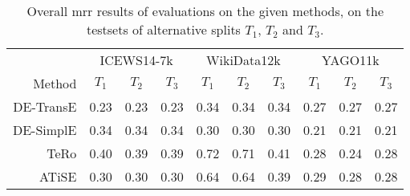 \begin{table}[htb]
\centering
\begin{minipage}{\columnwidthcaption}
\centering
\caption{Overall \gls{mrr} results of evaluations on the given methods, on the testsets of alternative splits $T_1$, $T_2$ and $T_3$.}
\label{tab:split_results}
\end{minipage}
\vspace{-3mm}

\begin{tabular}{r|ccc|ccc|ccc}
\hline
 & \multicolumn{3}{c|}{ICEWS14-7k} & \multicolumn{3}{c|}{WikiData12k} & \multicolumn{3}{c}{YAGO11k}\\
Method & $T_1$ & $T_2$ & $T_3$ & $T_1$ & $T_2$ & $T_3$ & $T_1$ & $T_2$ & $T_3$ \\
\hline
DE-TransE  & 0.23 & 0.23 & 0.23 & 0.34 & 0.34 & 0.34 & 0.27 & 0.27 & 0.27 \\
DE-SimplE  & 0.34 & 0.34 & 0.34 & 0.30 & 0.30 & 0.30 & 0.21 & 0.21 & 0.21 \\
TeRo  & 0.40 & 0.39 & 0.39 & 0.72 & 0.71 & 0.41 & 0.28 & 0.24 & 0.28 \\
ATiSE & 0.30 & 0.30 & 0.30 & 0.64 & 0.64 & 0.39 & 0.29 & 0.28 & 0.28 \\
\hline

\end{tabular}
\end{table}
